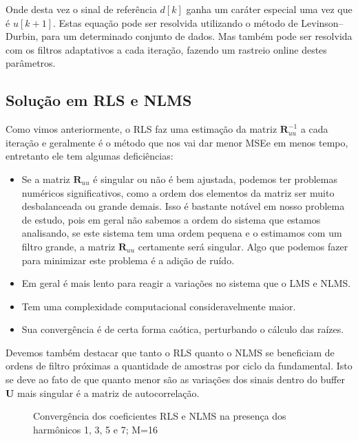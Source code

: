 Onde desta vez o sinal de referência $d[k]$ ganha um caráter especial uma vez que é $u[k+1]$. Estas equação pode ser resolvida utilizando o método de Levinson–Durbin, para um determinado conjunto de dados. Mas também pode ser resolvida com os filtros adaptativos a cada iteração, fazendo um rastreio online destes parâmetros.

\subsection{Solução em RLS e NLMS}

Como vimos anteriormente, o RLS faz uma estimação da matriz $\boldsymbol{R}_{uu}^{-1}$ a cada iteração e geralmente é o método que nos vai dar menor MSEe em menos tempo, entretanto ele tem algumas deficiências:

\begin{itemize}
	\item Se a matriz $\boldsymbol{R}_{uu}$ é singular ou não é bem ajustada, podemos ter problemas numéricos significativos, como a ordem dos elementos da matriz ser muito desbalanceada ou grande demais. Isso é bastante notável em nosso problema de estudo, pois em geral não sabemos a ordem do sistema que estamos analisando, se este sistema tem uma ordem pequena e o estimamos com um filtro grande, a matriz $\boldsymbol{R}_{uu}$ certamente será singular. Algo que podemos fazer para minimizar este problema é a adição de ruído.
	\item Em geral é mais lento para reagir a variações no sistema que o LMS e NLMS.
	\item Tem uma complexidade computacional consideravelmente maior.
	\item Sua convergência é de certa forma caótica, perturbando o cálculo das raízes.
\end{itemize}

Devemos também destacar que tanto o RLS quanto o NLMS se beneficiam de ordens de filtro próximas a quantidade de amostras por ciclo da fundamental. Isto se deve ao fato de que quanto menor são as variações dos sinais dentro do buffer $\boldsymbol{U}$ mais singular é a matriz de autocorrelação. 

\begin{figure}[h]
	\centering    
	\def\svgwidth{\columnwidth}
	
	\caption{Convergência dos coeficientes RLS e NLMS na presença dos harmônicos 1, 3, 5 e 7; M=16}
	\label{fig:your image label}
\end{figure}

